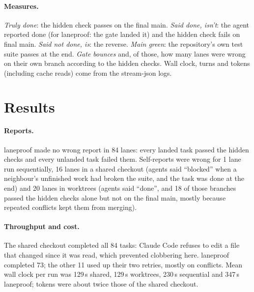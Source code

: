 \documentclass[11pt]{article}
\begin{document}
\paragraph{Measures.} \emph{Truly done}: the hidden check passes on the final main. \emph{Said done, isn't}: the agent
reported done (for laneproof: the gate landed it) and the hidden check fails on final main. \emph{Said not done, is}:
the reverse. \emph{Main green}: the repository's own test suite passes at the end. \emph{Gate bounces} and, of those,
how many lanes were wrong on their own branch according to the hidden checks. Wall clock, turns and tokens (including
cache reads) come from the stream-json logs.

\section{Results}
\begin{table}[h]
\centering\small

\caption{All runs, scored by \texttt{python3 bench/score.py} from the raw logs in \texttt{bench/runs/}. Bounces are
done-claims the gate sent back; the number in parentheses is how many of those lanes also failed the hidden checks on
their own branch.}
\end{table}

\paragraph{Reports.} laneproof made no wrong report in 84 lanes: every landed task passed the hidden checks and every
unlanded task failed them. Self-reports were wrong for 1 lane run sequentially, 16 lanes in a shared checkout (agents
said ``blocked'' when a neighbour's unfinished work had broken the suite, and the task was done at the end) and 20 lanes in
worktrees (agents said ``done'', and 18 of those branches passed the hidden checks alone but not on the final main,
mostly because repeated conflicts kept them from merging).

\paragraph{Throughput and cost.} The shared checkout completed all 84 tasks: Claude Code refuses to edit a file that
changed since it was read, which prevented clobbering here. laneproof completed 73; the other 11 used up their two
retries, mostly on conflicts. Mean wall clock per run was 129\,s shared, 129\,s worktrees, 230\,s sequential and
347\,s laneproof; tokens were about twice those of the shared checkout.
\end{document}
